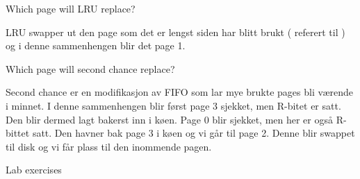 Which page will LRU replace?

LRU swapper ut den page som det er lengst siden har blitt brukt ( referert til ) og i denne sammenhengen blir det page 1. 

Which page will second chance replace?

Second chance er en modifikasjon av FIFO som lar mye brukte pages bli værende i minnet. I denne sammenhengen blir først page 3 sjekket, men R-bitet er satt. Den blir dermed lagt bakerst inn i køen. Page 0 blir sjekket, men her er også R-bittet satt. Den havner bak page 3 i køen og vi går til page 2. Denne blir swappet til disk og vi får plass til den inommende pagen.

Lab exercises


